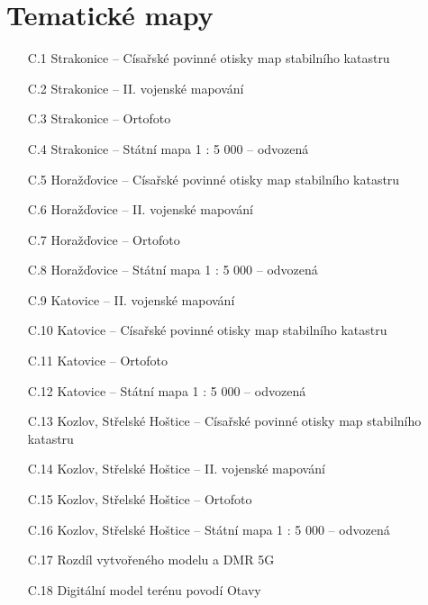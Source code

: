 \documentclass[thesis=M,czech]{FITthesis}[2012/06/26]
\begin{document}
\begin{figure}
\end{figure}


\chapter{Tematické mapy}

\begin{enumerate}
\item [C.1] Strakonice – Císařské povinné otisky map stabilního katastru
\item [C.2] Strakonice – II. vojenské mapování
\item [C.3] Strakonice – Ortofoto
\item [C.4] Strakonice – Státní mapa 1 : 5 000 – odvozená
\item [C.5] Horažďovice – Císařské povinné otisky map stabilního katastru
\item [C.6] Horažďovice – II. vojenské mapování
\item [C.7] Horažďovice – Ortofoto
\item [C.8] Horažďovice – Státní mapa 1 : 5 000 – odvozená
\item [C.9] Katovice – II. vojenské mapování
\item [C.10] Katovice – Císařské povinné otisky map stabilního katastru
\item [C.11] Katovice – Ortofoto
\item [C.12] Katovice – Státní mapa 1 : 5 000 – odvozená
\item [C.13] Kozlov, Střelské Hoštice – Císařské povinné otisky map stabilního katastru
\item [C.14] Kozlov, Střelské Hoštice – II. vojenské mapování
\item [C.15] Kozlov, Střelské Hoštice – Ortofoto
\item [C.16] Kozlov, Střelské Hoštice – Státní mapa 1 : 5 000 – odvozená
\item [C.17] Rozdíl vytvořeného modelu a DMR 5G
\item [C.18] Digitální model terénu povodí Otavy
\end{enumerate}
\end{document}
